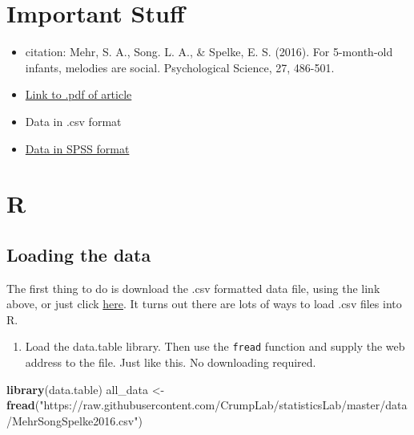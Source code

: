 \documentclass[]{book}
\newenvironment{Shaded}{\begin{snugshade}}{\end{snugshade}}
\newcommand{\KeywordTok}[1]{\textcolor[rgb]{0.13,0.29,0.53}{\textbf{#1}}}
\newcommand{\StringTok}[1]{\textcolor[rgb]{0.31,0.60,0.02}{#1}}
\newcommand{\NormalTok}[1]{#1}
\providecommand{\tightlist}{%
  \setlength{\itemsep}{0pt}\setlength{\parskip}{0pt}}
\begin{document}
\section{Important Stuff}\label{important-stuff}

\begin{itemize}
\tightlist
\item
  citation: Mehr, S. A., Song. L. A., \& Spelke, E. S. (2016). For
  5-month-old infants, melodies are social. Psychological Science, 27,
  486-501.
\item
  \href{http://journals.sagepub.com/stoken/default+domain/d5HcBHg85XamSXGdYqYN/full}{Link
  to .pdf of article}
\item
  Data in .csv format
\item
  \href{https://drive.google.com/open?id=0Bz-rhZ21ShvOa3c4X3hqOWxwcUU}{Data
  in SPSS format}
\end{itemize}

\section{R}\label{r-6}

\subsection{Loading the data}\label{loading-the-data}

The first thing to do is download the .csv formatted data file, using
the link above, or just click
\href{https://drive.google.com/open?id=0Bz-rhZ21ShvOdW1wV0pmUTJSSk0}{here}.
It turns out there are lots of ways to load .csv files into R.

\begin{enumerate}
\def\labelenumi{\arabic{enumi}.}
\tightlist
\item
  Load the data.table library. Then use the \texttt{fread} function and
  supply the web address to the file. Just like this. No downloading
  required.
\end{enumerate}

\begin{Shaded}
\begin{Highlighting}[]
\KeywordTok{library}\NormalTok{(data.table)}
\NormalTok{all_data <-}\StringTok{ }\KeywordTok{fread}\NormalTok{(}\StringTok{"https://raw.githubusercontent.com/CrumpLab/statisticsLab/master/data/MehrSongSpelke2016.csv"}\NormalTok{)}
\end{Highlighting}
\end{Shaded}
\end{document}
